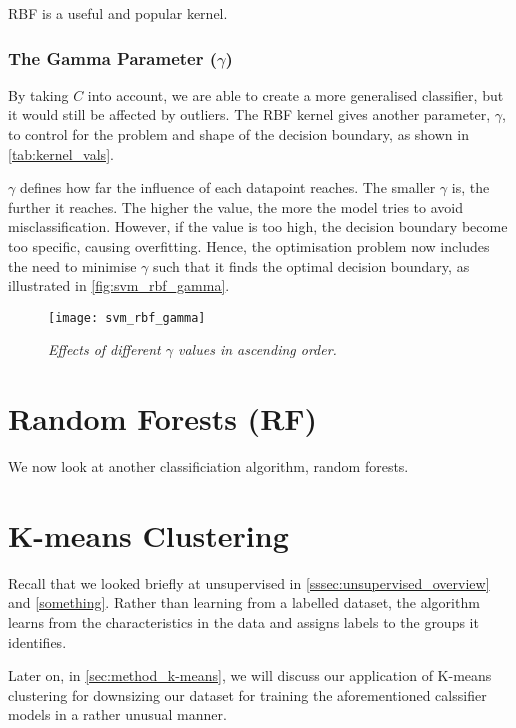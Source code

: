 \documentclass[dissertation.tex]{subfiles}
\begin{document}
RBF is a useful and popular kernel.

\subsubsection{The Gamma Parameter ($\gamma$)}
By taking $C$ into account, we are able to create a more generalised classifier, but it would still be affected by outliers. The RBF kernel gives another parameter, $\gamma$, to control for the problem and shape of the decision boundary, as shown in \autoref{tab:kernel_vals}.

$\gamma$ defines how far the influence of each datapoint reaches. The smaller $\gamma$ is, the further it reaches. The higher the value, the more the model tries to avoid misclassification. However, if the value is too high, the decision boundary become too specific, causing overfitting. Hence, the optimisation problem now includes the need to minimise $\gamma$ such that it finds the optimal decision boundary, as illustrated in \autoref{fig:svm_rbf_gamma}.


\begin{figure}[h]
  \centering
  \texttt{[image: svm\_rbf\_gamma]}
  \caption{\textit{Effects of different $\gamma$ values in ascending order.}}
  \label{fig:svm_rbf_gamma}
\end{figure}

\newpage
\section{Random Forests (RF)}
We now look at another classificiation algorithm, random forests.

\newpage
\section{K-means Clustering}
Recall that we looked briefly at unsupervised in \autoref{sssec:unsupervised_overview} and \ref{something}. Rather than learning from a labelled dataset, the algorithm learns from the characteristics in the data and assigns labels to the groups it identifies.

Later on, in \autoref{sec:method_k-means}, we will discuss our application of K-means clustering for downsizing our dataset for training the aforementioned calssifier models in a rather unusual manner. 
\end{document}
